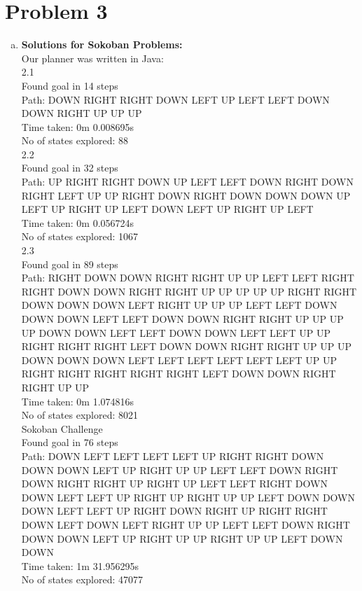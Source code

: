 \documentclass[]{article}
\begin{document}
\section{Problem 3}
	\begin{enumerate}[(a)]
		\item \textbf{Solutions for Sokoban Problems:}\\
		Our planner was written in Java:\\
		2.1\\
		Found goal in 14 steps\\
		Path: DOWN RIGHT RIGHT DOWN LEFT UP LEFT LEFT DOWN DOWN RIGHT UP UP UP\\
		Time taken: 0m 0.008695s\\
		No of states explored: 88\\
		
		2.2\\
		Found goal in 32 steps\\
		Path: UP RIGHT RIGHT DOWN UP LEFT LEFT DOWN RIGHT DOWN RIGHT LEFT UP UP RIGHT DOWN RIGHT DOWN DOWN DOWN UP LEFT UP RIGHT UP LEFT DOWN LEFT UP RIGHT UP LEFT\\
		Time taken: 0m 0.056724s\\
		No of states explored: 1067\\
		
		2.3\\
		Found goal in 89 steps\\
		Path: RIGHT DOWN DOWN RIGHT RIGHT UP UP LEFT LEFT RIGHT RIGHT DOWN DOWN RIGHT RIGHT UP UP UP UP UP RIGHT RIGHT DOWN DOWN DOWN LEFT RIGHT UP UP UP LEFT LEFT DOWN DOWN DOWN LEFT LEFT DOWN DOWN RIGHT RIGHT UP UP UP UP DOWN DOWN LEFT LEFT DOWN DOWN LEFT LEFT UP UP RIGHT RIGHT RIGHT LEFT DOWN DOWN RIGHT RIGHT UP UP UP DOWN DOWN DOWN LEFT LEFT LEFT LEFT LEFT LEFT UP UP RIGHT RIGHT RIGHT RIGHT RIGHT LEFT DOWN DOWN RIGHT RIGHT UP UP\\
		Time taken: 0m 1.074816s\\
		No of states explored: 8021\\
		
		Sokoban Challenge\\
		Found goal in 76 steps\\
		Path: DOWN LEFT LEFT LEFT LEFT UP RIGHT RIGHT DOWN DOWN DOWN LEFT UP RIGHT UP UP LEFT LEFT DOWN RIGHT DOWN RIGHT RIGHT UP RIGHT UP LEFT LEFT RIGHT DOWN DOWN LEFT LEFT UP RIGHT UP RIGHT UP UP LEFT DOWN DOWN DOWN LEFT LEFT UP RIGHT DOWN RIGHT UP RIGHT RIGHT DOWN LEFT DOWN LEFT RIGHT UP UP LEFT LEFT DOWN RIGHT DOWN DOWN LEFT UP RIGHT UP UP RIGHT UP UP LEFT DOWN DOWN\\
		Time taken: 1m 31.956295s\\
		No of states explored: 47077\\
		

\end{enumerate}
\end{document}
